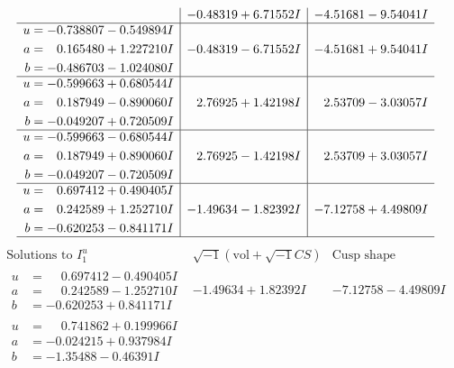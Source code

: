 \documentclass[1p]{elsarticle_modified}
\theoremstyle{definition}
\newcommand{\I}{\sqrt{-1}}
\begin{document}
$$\begin{array}{c|c|c}
 & -0.48319 + 6.71552 I & -4.51681 - 9.54041 I \\ \hline\begin{aligned}
u &= -0.738807 - 0.549894 I \\
a &= \phantom{-}0.165480 + 1.227210 I \\
b &= -0.486703 - 1.024080 I\end{aligned}
 & -0.48319 - 6.71552 I & -4.51681 + 9.54041 I \\ \hline\begin{aligned}
u &= -0.599663 + 0.680544 I \\
a &= \phantom{-}0.187949 - 0.890060 I \\
b &= -0.049207 + 0.720509 I\end{aligned}
 & \phantom{-}2.76925 + 1.42198 I & \phantom{-}2.53709 - 3.03057 I \\ \hline\begin{aligned}
u &= -0.599663 - 0.680544 I \\
a &= \phantom{-}0.187949 + 0.890060 I \\
b &= -0.049207 - 0.720509 I\end{aligned}
 & \phantom{-}2.76925 - 1.42198 I & \phantom{-}2.53709 + 3.03057 I \\ \hline\begin{aligned}
u &= \phantom{-}0.697412 + 0.490405 I \\
a &= \phantom{-}0.242589 + 1.252710 I \\
b &= -0.620253 - 0.841171 I\end{aligned}
 & -1.49634 - 1.82392 I & -7.12758 + 4.49809 I\\
 \hline 
 \end{array}$$\newpage$$\begin{array}{c|c|c}  
\text{Solutions to }I^u_{1}& \I (\text{vol} + \sqrt{-1}CS) & \text{Cusp shape}\\
 \hline 
\begin{aligned}
u &= \phantom{-}0.697412 - 0.490405 I \\
a &= \phantom{-}0.242589 - 1.252710 I \\
b &= -0.620253 + 0.841171 I\end{aligned}
 & -1.49634 + 1.82392 I & -7.12758 - 4.49809 I \\ \hline\begin{aligned}
u &= \phantom{-}0.741862 + 0.199966 I \\
a &= -0.024215 + 0.937984 I \\
b &= -1.35488 - 0.46391 I\end{aligned}

\end{array}$$
\end{document}
